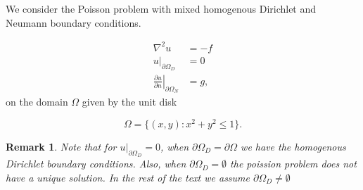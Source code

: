 \documentclass[a4paper,english]{elsarticle}%
\newcommand{\restr}[2]{\ensuremath{\left.#1\right|_{#2}}}
\newtheorem*{remark}{Remark}
\begin{document}
We consider the Poisson problem with mixed homogenous Dirichlet and Neumann boundary conditions. 

\begin{equation}
\begin{aligned}
    \nabla^2 u &= - f \\
    \restr{u}{\partial \Omega_{D}}  &= 0 \\
    \restr{\frac{\partial u}{\partial n}}{\partial \Omega_{N}} &= g,
\label{poission-problem}
\end{aligned}
\end{equation}
on the domain $\Omega$ given by the unit disk

\begin{equation*}
    \Omega = \{(x,y) : x^2+ y^2 \leq 1 \}.
\end{equation*}
\begin{remark}
Note that for $\restr{u}{\partial \Omega_D} = 0$, when $\partial \Omega_{D} = \partial \Omega$ we have the homogenous Dirichlet boundary conditions. Also, when $\partial \Omega_D = \emptyset$ the poission problem does not have a unique solution. In the rest of the text we assume $\partial \Omega_D \neq \emptyset$ 
\end{remark}
\end{document}
